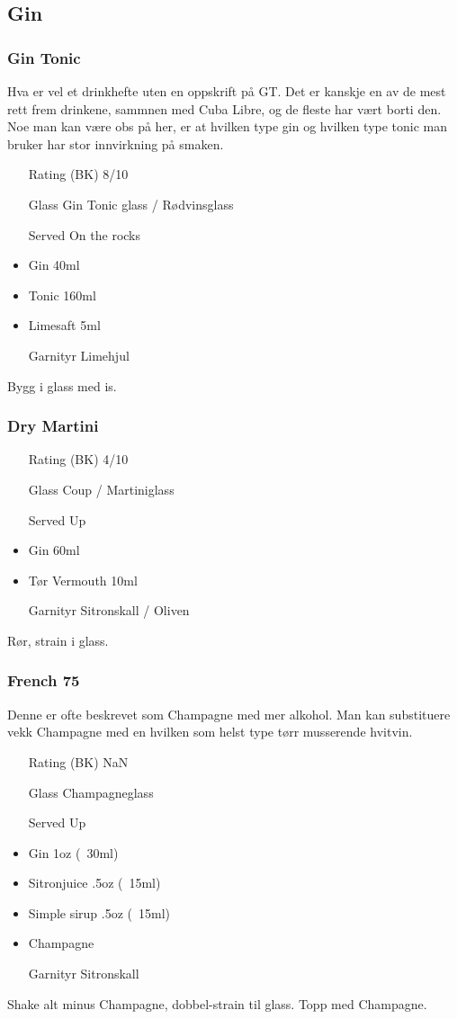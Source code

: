 \subsection{Gin}
\subsubsection{Gin Tonic}
Hva er vel et drinkhefte uten en oppskrift på GT. Det er kanskje en av de mest rett frem drinkene, sammnen med Cuba Libre, og de fleste har vært borti den. Noe man kan være obs på her, er at hvilken type gin og hvilken type tonic man bruker har stor innvirkning på smaken.
\begin{itemize}
    \item[Rating (BK)] 8/10
    \item[Glass] Gin Tonic glass / Rødvinsglass
    \item[Served] On the rocks
    \item Gin 40ml
    \item Tonic 160ml
    \item Limesaft 5ml
    \item[Garnityr] Limehjul
\end{itemize}
Bygg i glass med is.

\subsubsection{Dry Martini}
\begin{itemize}
    \item[Rating (BK)] 4/10
    \item[Glass] Coup / Martiniglass
    \item[Served] Up
    \item Gin 60ml
    \item Tør Vermouth 10ml
    \item[Garnityr] Sitronskall / Oliven
\end{itemize}
Rør, strain i glass.

\subsubsection{French 75}
Denne er ofte beskrevet som Champagne med mer alkohol. Man kan substituere vekk Champagne med en hvilken som helst type tørr musserende hvitvin.

\begin{itemize}
    \item[Rating (BK)] NaN
    \item[Glass] Champagneglass
    \item[Served] Up
    \item Gin 1oz (~30ml)
    \item Sitronjuice .5oz (~15ml)
    \item Simple sirup .5oz (~15ml)
    \item Champagne
    \item[Garnityr] Sitronskall
\end{itemize}
Shake alt minus Champagne, dobbel-strain til glass. Topp med Champagne.

